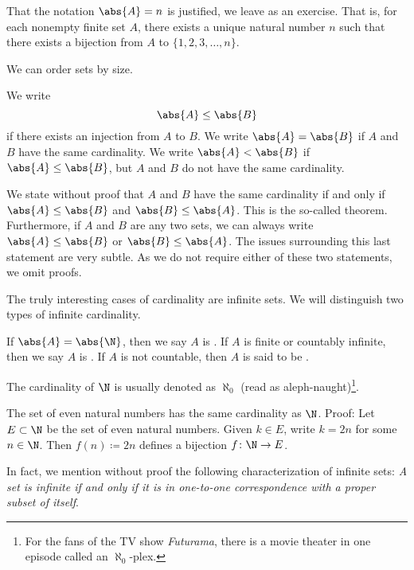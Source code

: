 That the notation $\abs{A} = n$ is justified, we leave as an exercise.  That
is, for each nonempty finite set $A$, there exists a unique natural number
$n$ such that there exists a bijection from $A$ to $\{ 1,2,3,\ldots,n \}$.

We can order sets by size.

\begin{defn} \label{def:comparecards}
We write
\begin{equation*}
\abs{A} \leq \abs{B}
\end{equation*}
if there exists an injection from $A$ to $B$.  We write $\abs{A} = \abs{B}$
if $A$ and $B$ have the same cardinality.  We write $\abs{A} < \abs{B}$
if $\abs{A} \leq \abs{B}$, but $A$ and $B$ do not have the same cardinality.
\end{defn}

We state without proof that
$A$ and $B$ have the same cardinality if and only if
$\abs{A} \leq \abs{B}$ and
$\abs{B} \leq \abs{A}$.  This is the so-called
 theorem.
Furthermore, if $A$ and $B$ are any two sets,
we can always write $\abs{A} \leq \abs{B}$ or
$\abs{B} \leq \abs{A}$.  The issues surrounding this
last statement are very subtle.  As we do not require either
of these two statements, we omit proofs.

The truly interesting cases of cardinality are infinite sets.
We will distinguish two types of infinite cardinality.

\begin{defn}
If $\abs{A} = \abs{\N}$, then we say $A$ is
\emph{}.
If $A$ is finite or countably infinite, then we say $A$
is \emph{}.
If $A$ is not countable, then
$A$ is said to be \emph{}.
\end{defn}

The cardinality of $\N$ is usually denoted as
$\aleph_0$ (read as aleph-naught)\footnote{For the fans of the TV show
\emph{Futurama}, there is a movie theater in one episode
called an $\aleph_0$-plex.}.

\begin{example}
The set of even natural numbers has the same cardinality as $\N$.  Proof:
Let $E \subset \N$ be the set of even natural numbers.
Given $k \in E$, write $k=2n$ for some $n \in \N$.
Then $f(n) \coloneqq 2n$ defines a bijection $f \colon \N \to E$.
\end{example}

In fact, we mention without proof the following characterization
of infinite sets: \emph{A set is infinite if and only if it is in one-to-one
correspondence with a proper subset of itself}.


